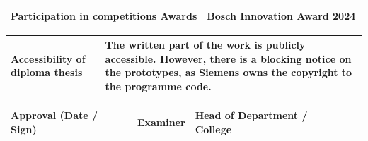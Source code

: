 \vspace{0.5cm}

\begin{tabular}{|p{53mm}|p{103mm}|}
\hline
\vspace{-0.11cm} Participation in competitions Awards \vspace{0.11cm} &
\vspace{-0.11cm} Bosch Innovation Award 2024 \vspace{0.11cm} \\
\hline
\end{tabular}

\vspace{0.5cm}

\begin{tabular}{|p{53mm}|p{103mm}|}
\hline
\vspace{-0.11cm} Accessibility of diploma thesis \vspace{0.11cm} &
\vspace{-0.11cm} The written part of the work is publicly accessible. However, there is a blocking notice on the prototypes, as Siemens owns the copyright to the programme code. \vspace{0.11cm} \\
\hline
\end{tabular}

\vspace{0.5cm}

\begin{tabular}{|p{5.3cm}|p{4.93cm}|p{4.93cm}|@{}m{0cm}@{}}
\hline
\vspace{-0.11cm} Approval \newline (Date / Sign) \vspace{0.11cm} & 
\vspace{-0.11cm} Examiner \vspace{0.11cm} & 
\vspace{-0.11cm} Head of Department / \newline College \vspace{0.11cm} & \\ [4cm]
\hline
\end{tabular}
